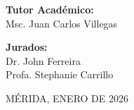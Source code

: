 \begin{titlepage}
\begin{center}
\begin{minipage}[t]{0.48\textwidth}
			\textbf{Tutor Académico:}\\
			Msc. Juan Carlos Villegas
		\end{minipage}
		\hfill
		\begin{minipage}[t]{0.48\textwidth}
			\raggedleft
			\normalsize
			\textbf{Jurados:}\\
			Dr. John Ferreira\\
			Profa. Stephanie Carrillo
		\end{minipage}
		
		\vspace{1.2cm}  %
		
		{\normalsize
			MÉRIDA, ENERO DE 2026
		}
		
	\end{center}
\end{titlepage}